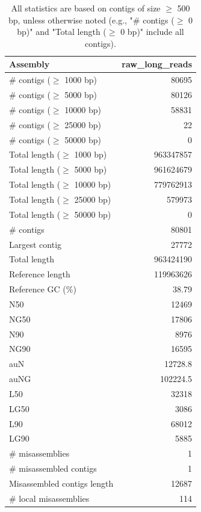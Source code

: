 \documentclass[12pt,a4paper]{article}
\begin{document}
\begin{table}[ht]
\begin{center}
\caption{All statistics are based on contigs of size $\geq$ 500 bp, unless otherwise noted (e.g., "\# contigs ($\geq$ 0 bp)" and "Total length ($\geq$ 0 bp)" include all contigs).}
\begin{tabular}{|l*{1}{|r}|}
\hline
Assembly & raw\_long\_reads \\ \hline
\# contigs ($\geq$ 1000 bp) & 80695 \\ \hline
\# contigs ($\geq$ 5000 bp) & 80126 \\ \hline
\# contigs ($\geq$ 10000 bp) & 58831 \\ \hline
\# contigs ($\geq$ 25000 bp) & 22 \\ \hline
\# contigs ($\geq$ 50000 bp) & 0 \\ \hline
Total length ($\geq$ 1000 bp) & 963347857 \\ \hline
Total length ($\geq$ 5000 bp) & 961624679 \\ \hline
Total length ($\geq$ 10000 bp) & 779762913 \\ \hline
Total length ($\geq$ 25000 bp) & 579973 \\ \hline
Total length ($\geq$ 50000 bp) & 0 \\ \hline
\# contigs & 80801 \\ \hline
Largest contig & 27772 \\ \hline
Total length & 963424190 \\ \hline
Reference length & 119963626 \\ \hline
Reference GC (\%) & 38.79 \\ \hline
N50 & 12469 \\ \hline
NG50 & 17806 \\ \hline
N90 & 8976 \\ \hline
NG90 & 16595 \\ \hline
auN & 12728.8 \\ \hline
auNG & 102224.5 \\ \hline
L50 & 32318 \\ \hline
LG50 & 3086 \\ \hline
L90 & 68012 \\ \hline
LG90 & 5885 \\ \hline
\# misassemblies & 1 \\ \hline
\# misassembled contigs & 1 \\ \hline
Misassembled contigs length & 12687 \\ \hline
\# local misassemblies & 114 \\ \hline

\end{tabular}
\end{center}
\end{table}
\end{document}
